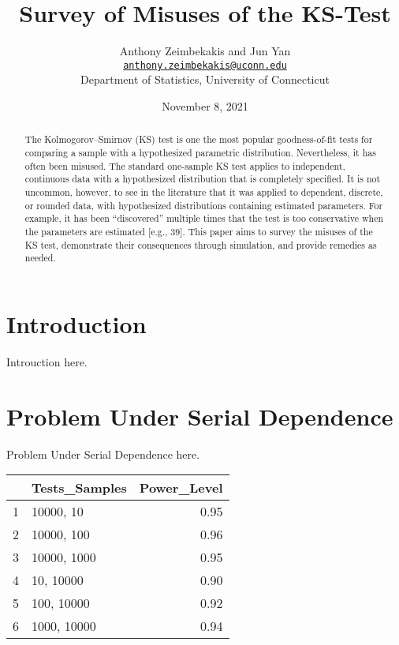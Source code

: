 \documentclass[12pt, letterpaper, titlepage]{article}
\title{Survey of Misuses of the KS-Test}
\author{Anthony Zeimbekakis and Jun Yan\\
\href{mailto:anthony.zeimbekakis@uconn.edu}{\nolinkurl{anthony.zeimbekakis@uconn.edu}}\\
Department of Statistics, University of Connecticut}
\date{November 8, 2021}
\begin{document}
\maketitle

\doublespace

\begin{abstract}
The Kolmogorov–Smirnov (KS) test is one the most popular goodness-of-fit tests for comparing a sample with a hypothesized parametric distribution. Nevertheless, it has often been misused. The standard one-sample KS test applies to independent, continuous data with a hypothesized distribution that is completely specified. It is not uncommon, however, to see in the literature that it was applied to dependent, discrete, or rounded data, with hypothesized distributions containing estimated parameters. For example, it has been “discovered” multiple times that the test is too conservative when the parameters are estimated [e.g., 39]. This paper aims to survey the misuses of the KS test, demonstrate their consequences through simulation, and provide remedies as needed.
\end{abstract}


\hypertarget{sec:intro}{%
\section{Introduction}\label{sec:intro}}

Introuction here.

\hypertarget{sec:litrev}{%
\section{Problem Under Serial Dependence}\label{sec:litrev}}

Problem Under Serial Dependence here.

\begin{table}[ht]
\centering
\begin{tabular}{rlr}
  \hline
 & Tests\_Samples & Power\_Level \\ 
  \hline
1 & 10000, 10 & 0.95 \\ 
  2 & 10000, 100 & 0.96 \\ 
  3 & 10000, 1000 & 0.95 \\ 
  4 & 10, 10000 & 0.90 \\ 
  5 & 100, 10000 & 0.92 \\ 
  6 & 1000, 10000 & 0.94 \\ 
   \hline
\end{tabular}
\end{table}
\end{document}
